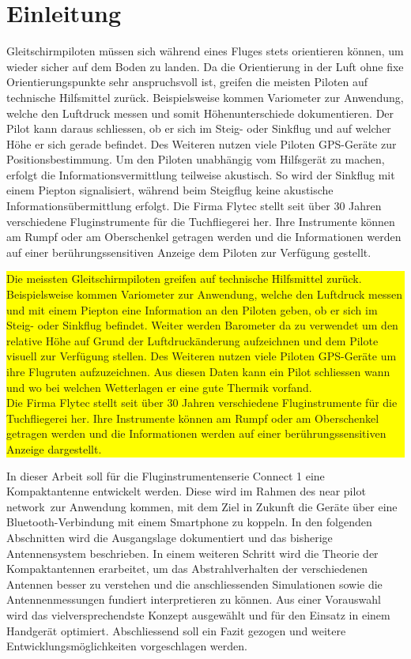 \newpage
\section{Einleitung}
Gleitschirmpiloten müssen sich während eines Fluges stets orientieren können, um wieder sicher auf dem Boden zu landen. Da die Orientierung in der Luft ohne fixe Orientierungspunkte sehr anspruchsvoll ist, greifen die meisten Piloten auf technische Hilfsmittel zurück. Beispielsweise kommen Variometer zur Anwendung, welche den Luftdruck messen und somit Höhenunterschiede dokumentieren. Der Pilot kann daraus schliessen, ob er sich im Steig- oder Sinkflug  und auf welcher Höhe er sich gerade befindet. Des Weiteren nutzen viele Piloten GPS-Geräte zur Positionsbestimmung. Um den Piloten unabhängig vom Hilfsgerät zu machen, erfolgt die Informationsvermittlung teilweise akustisch. So wird der Sinkflug  mit einem Piepton signalisiert, während beim Steigflug keine akustische Informationsübermittlung erfolgt. Die Firma Flytec stellt seit über 30 Jahren verschiedene Fluginstrumente für die Tuchfliegerei her. Ihre Instrumente können am Rumpf oder am Oberschenkel getragen werden und die Informationen werden auf einer berührungssensitiven Anzeige dem Piloten zur Verfügung gestellt.\\

\colorbox{yellow}{\parbox[t]{\textwidth}{
Die meissten Gleitschirmpiloten greifen auf technische Hilfsmittel zurück. Beispielsweise kommen Variometer zur Anwendung, welche den Luftdruck messen und mit einem Piepton eine Information an den Piloten geben, ob er sich im Steig- oder Sinkflug befindet. Weiter werden Barometer da zu verwendet um den relative Höhe auf Grund der Luftdruckänderung aufzeichnen und dem Pilote visuell zur Verfügung stellen. Des Weiteren nutzen viele Piloten GPS-Geräte um ihre Flugruten aufzuzeichnen. Aus diesen Daten kann ein Pilot schliessen wann und wo bei welchen Wetterlagen er eine gute Thermik vorfand.\\ 
Die Firma Flytec stellt seit über 30 Jahren verschiedene Fluginstrumente für die Tuchfliegerei her. Ihre Instrumente können am Rumpf oder am Oberschenkel getragen werden und die Informationen werden auf einer berührungssensitiven Anzeige dargestellt.\\
}}

In dieser Arbeit soll für die Fluginstrumentenserie \glqq Connect 1 \grqq eine Kompaktantenne entwickelt werden. Diese wird im Rahmen des \glqq near pilot network\grqq \ zur Anwendung kommen, mit dem Ziel in Zukunft die Geräte  über eine Bluetooth-Verbindung mit einem Smartphone zu koppeln. In den folgenden Abschnitten wird die Ausgangslage dokumentiert und das bisherige Antennensystem beschrieben. In einem weiteren Schritt wird die Theorie der Kompaktantennen erarbeitet, um das Abstrahlverhalten der verschiedenen Antennen besser zu verstehen und die anschliessenden Simulationen sowie die Antennenmessungen fundiert interpretieren zu können. Aus einer Vorauswahl wird das vielversprechendste Konzept ausgewählt und für den Einsatz in einem Handgerät optimiert. Abschliessend soll ein Fazit gezogen und weitere Entwicklungsmöglichkeiten vorgeschlagen werden.

